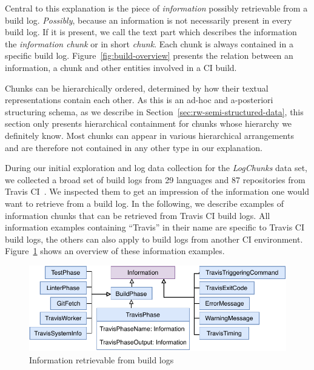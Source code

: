 \documentclass[\myrootdir/main.tex]{subfiles}
\begin{document}
Central to this explanation is the piece of \emph{information} possibly retrievable from a build log.
\emph{Possibly}, because an information is not necessarily present in every build log.
If it is present, we call the text part which describes the information the \emph{information chunk} or in short \emph{chunk}.
Each chunk is always contained in a specific build log.
Figure~\ref{fig:build-overview} presents the relation between an information, a chunk and other entities involved in a CI build.

Chunks can be hierarchically ordered, determined by how their textual representations contain each other.
As this is an ad-hoc and a-posteriori structuring schema, as we describe in Section~\ref{sec:rw-semi-structured-data}, this section only presents hierarchical containment for chunks whose hierarchy we definitely know.
Most chunks can appear in various hierarchical arrangements and are therefore not contained in any other type in our explanation.

During our initial exploration and log data collection for the \emph{LogChunks} data set, we collected a broad set of build logs from 29 languages and 87 repositories from Travis CI~\cite{travisci2019webpage}.
We inspected them to get an impression of the information one would want to retrieve from a build log.
In the following, we describe examples of information chunks that can be retrieved from Travis CI build logs.
All information examples containing ``Travis'' in their name are specific to Travis CI build logs, the others can also apply to build logs from another CI environment.
Figure~\ref{fig:build-log-information} shows an overview of these information examples.

\begin{figure}[htbp]
	\centering
	\includegraphics[width=\textwidth, clip]{img/build-log-information.pdf}
	\caption{Information retrievable from build logs}
	\label{fig:build-log-information}
\end{figure}
\end{document}
